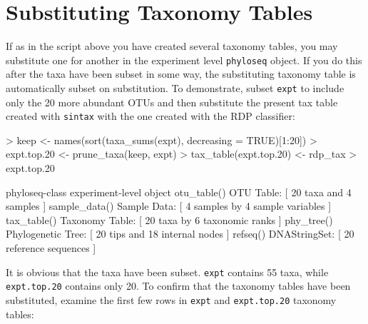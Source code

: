 \documentclass{article}
\begin{document}
\section*{Substituting Taxonomy Tables}

If as in the script above you have created several taxonomy tables, you may substitute one for another in the experiment level \texttt{phyloseq} object. If you do this after the taxa have been subset in some way, the substituting taxonomy table is automatically subset on substitution. To demonstrate, subset \texttt{expt} to include only the 20 more abundant OTUs and then substitute the present tax table created with \texttt{sintax} with the one created with the RDP classifier:  

\begin{Schunk}
\begin{Sinput}
> keep <- names(sort(taxa_sums(expt), decreasing = TRUE)[1:20])
> expt.top.20 <- prune_taxa(keep, expt)
> tax_table(expt.top.20) <- rdp_tax
> expt.top.20
\end{Sinput}
\begin{Soutput}
phyloseq-class experiment-level object
otu_table()   OTU Table:         [ 20 taxa and 4 samples ]
sample_data() Sample Data:       [ 4 samples by 4 sample variables ]
tax_table()   Taxonomy Table:    [ 20 taxa by 6 taxonomic ranks ]
phy_tree()    Phylogenetic Tree: [ 20 tips and 18 internal nodes ]
refseq()      DNAStringSet:      [ 20 reference sequences ]
\end{Soutput}
\end{Schunk}

It is obvious that the taxa have been subset. \texttt{expt} contains 55 taxa, while \texttt{expt.top.20} contains only 20. To confirm that the taxonomy tables have been substituted, examine the first few rows in \texttt{expt} and \texttt{expt.top.20} taxonomy tables:  
\end{document}
